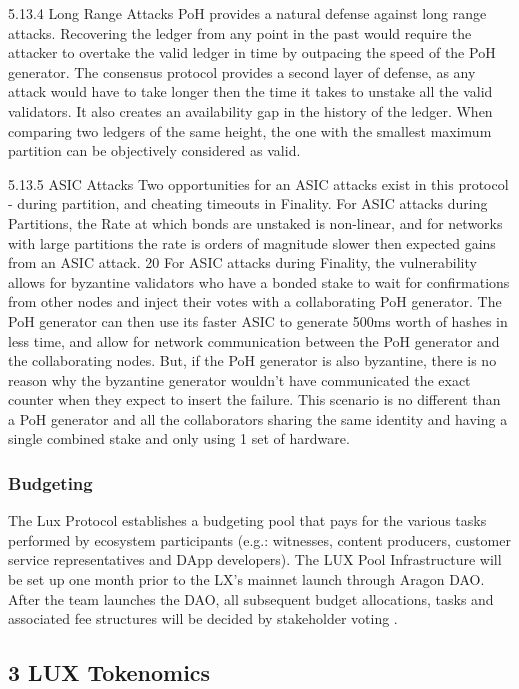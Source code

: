 \documentclass[11pt]{article}
\begin{document}
5.13.4 Long Range Attacks PoH provides a natural defense against long range attacks. Recovering the ledger from any point in the past would require the attacker to overtake the valid ledger in time by outpacing the speed of the PoH generator. The consensus protocol provides a second layer of defense, as any attack would have to take longer then the time it takes to unstake all the valid validators. It also creates an availability gap in the history of the ledger. When comparing two ledgers of the same height, the one with the smallest maximum partition can be objectively considered as valid.


5.13.5 ASIC Attacks Two opportunities for an ASIC attacks exist in this protocol - during partition, and cheating timeouts in Finality. For ASIC attacks during Partitions, the Rate at which bonds are unstaked is non-linear, and for networks with large partitions the rate is orders of magnitude slower then expected gains from an ASIC attack. 20 For ASIC attacks during Finality, the vulnerability allows for byzantine validators who have a bonded stake to wait for confirmations from other nodes and inject their votes with a collaborating PoH generator. The PoH generator can then use its faster ASIC to generate 500ms worth of hashes in less time, and allow for network communication between the PoH generator and the collaborating nodes. But, if the PoH generator is also byzantine, there is no reason why the byzantine generator wouldn't have communicated the exact counter when they expect to insert the failure. This scenario is no different than a PoH generator and all the collaborators sharing the same identity and having a single combined stake and only using 1 set of hardware.


\subsubsection{Budgeting}

The Lux Protocol establishes a budgeting pool that pays for the various tasks performed by ecosystem participants (e.g.: witnesses, content producers, customer service representatives and DApp developers). The LUX Pool Infrastructure will be set up one month prior to the LX's mainnet launch through Aragon DAO. After the team launches the DAO, all subsequent budget allocations, tasks and associated fee structures will be decided by stakeholder voting .


\subsection{3 LUX Tokenomics}
\end{document}
